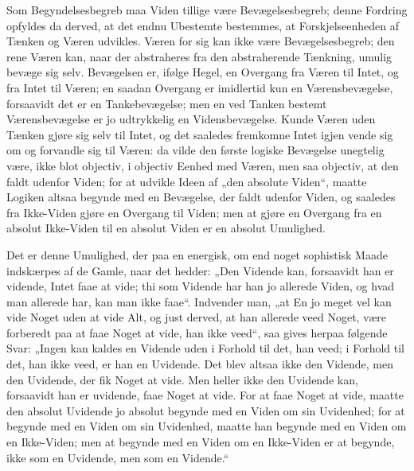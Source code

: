 \documentclass[11pt]{book}
\newcommand{\opage}[1]{\marginnote{\footnotesize\textit{[#1]}}}
\begin{document}
Som Begyndelsesbegreb maa Viden tillige være Bevægelsesbegreb; denne
Fordring opfyldes da derved, at det endnu Ubestemte bestemmes, at
Forskjelseenheden af Tænken og Væren udvikles. Væren for sig kan ikke
være Bevægelsesbegreb; den rene Væren kan, naar der abstraheres fra den
abstraherende Tænkning, umulig bevæge sig selv. Bevægelsen er, ifølge
Hegel, en Overgang fra Væren til Intet, og fra Intet til Væren; en
saadan Overgang er imidlertid kun en Værensbevægelse, forsaavidt det er
en Tankebevægelse; men en ved Tanken bestemt Værensbevægelse er jo
udtrykkelig en Vidensbevægelse. Kunde Væren uden Tænken gjøre sig selv
til Intet, og det saaledes fremkomne Intet igjen vende sig om og
forvandle sig til Væren: da vilde den første logiske Bevægelse
unegtelig være, ikke blot objectiv, i objectiv Eenhed med Væren, men
saa objectiv, at den faldt udenfor Viden; for at udvikle Ideen af „den
absolute Viden“, maatte Logiken altsaa begynde med en Bevægelse, der
faldt udenfor Viden, og saaledes fra Ikke-Viden gjøre en Overgang til
Viden; men at gjøre en
\opage{6} \setcounter{footnote}{0}%
Overgang fra en absolut Ikke-Viden til en absolut Viden er en absolut
Umulighed.

Det er denne Umulighed, der paa en energisk, om end noget sophistisk
Maade indskærpes af de Gamle, naar det hedder: „Den Vidende kan,
forsaavidt han er vidende, Intet faae at vide; thi som Vidende har han
jo allerede Viden, og hvad man allerede har, kan man ikke faae“.
Indvender man, „at En jo meget vel kan vide Noget uden at vide Alt, og
just derved, at han allerede veed Noget, være forberedt paa at faae
Noget at vide, han ikke veed“, saa gives herpaa følgende Svar: „Ingen
kan kaldes en Vidende uden i Forhold til det, han veed; i Forhold til
det, han ikke veed, er han en Uvidende. Det blev altsaa ikke den
Vidende, men den Uvidende, der fik Noget at vide. Men heller ikke den
Uvidende kan, forsaavidt han er uvidende, faae Noget at vide. For at
faae Noget at vide, maatte den absolut Uvidende jo absolut begynde med
en Viden om sin Uvidenhed; for at begynde med en Viden om sin
Uvidenhed, maatte han begynde med en Viden om en Ikke-Viden; men at
begynde med en Viden om en Ikke-Viden er at begynde, ikke som en
Uvidende, men som en Vidende.“
\end{document}
